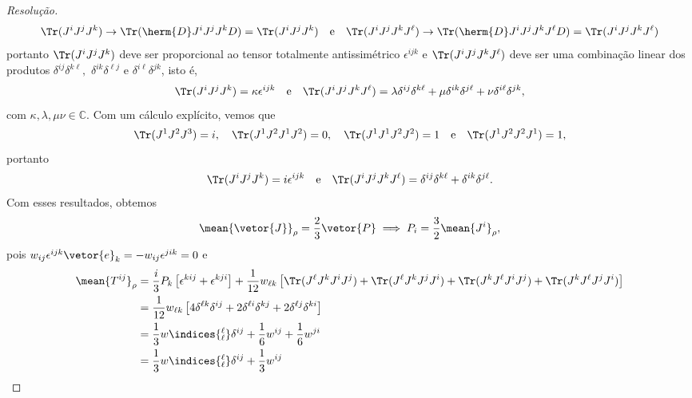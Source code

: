 \begin{proof}[Resolução]
    \begin{equation*}
        \Tr(J^i J^j J^k) \to \Tr(\herm{D} J^i J^j J^k D) = \Tr(J^i J^j J^k)\quad\text{e}\quad
        \Tr(J^i J^j J^k J^\ell) \to \Tr(\herm{D} J^i J^j J^k J^\ell D) = \Tr(J^i J^j J^k J^\ell)
    \end{equation*}
    portanto \(\Tr(J^i J^j J^k)\) deve ser proporcional ao tensor totalmente antissimétrico \(\epsilon^{ijk}\) e \(\Tr(J^i J^j J^k J^\ell)\) deve ser uma combinação linear dos produtos \(\delta^{ij} \delta^{k \ell},\) \(\delta^{i k} \delta^{\ell j}\) e \(\delta^{i \ell} \delta^{jk}\), isto é,
    \begin{equation*}
        \Tr(J^i J^j J^k) = \kappa \epsilon^{ijk}
        \quad\text{e}\quad
        \Tr(J^i J^j J^k J^\ell) = \lambda \delta^{ij} \delta^{k\ell} + \mu \delta^{i k} \delta^{j \ell} + \nu \delta^{i \ell} \delta^{jk},
    \end{equation*}
    com \(\kappa, \lambda, \mu \nu \in \mathbb{C}\). Com um cálculo explícito, vemos que 
    \begin{equation*}
        \Tr(J^1 J^2 J^3) = i,\quad\Tr(J^1 J^2 J^1 J^2) = 0,\quad \Tr(J^1 J^1 J^2 J^2) = 1\quad\text{e}\quad\Tr(J^1 J^2 J^2 J^1) = 1, 
    \end{equation*}
    portanto 
    \begin{equation*}
        \Tr(J^i J^j J^k) = i \epsilon^{ijk}
        \quad\text{e}\quad
        \Tr(J^i J^j J^k J^\ell) = \delta^{ij} \delta^{k \ell} + \delta^{ik} \delta^{j \ell}.
    \end{equation*}
    Com esses resultados, obtemos
    \begin{equation*}
        \mean{\vetor{J}}_{\rho} = \frac23 \vetor{P} \implies P_i = \frac32 \mean{J^i}_\rho,
    \end{equation*}
    pois \(w_{ij} \epsilon^{ijk} \vetor{e}_k = - w_{ij} \epsilon^{jik} = 0\) e
    \begin{align*}
        \mean{T^{ij}}_{\rho} &= \frac{i}{3} P_k \left[\epsilon^{kij} + \epsilon^{kji}\right] + \frac1{12} w_{\ell k} \left[\Tr(J^\ell J^k J^i J^j) + \Tr(J^\ell J^k J^j J^i) + \Tr(J^k J^\ell J^i J^j) + \Tr(J^k J^\ell J^j J^i)\right]\\
                             &= \frac{1}{12} w_{\ell k} \left[4\delta^{\ell k} \delta^{ij} + 2\delta^{\ell i} \delta^{kj} + 2\delta^{\ell j} \delta^{ki}\right]\\
                             &= \frac13 w\indices{^\ell_\ell}\delta^{ij} + \frac16 w^{ij} + \frac16 w^{ji}\\
                             &= \frac13 w\indices{^\ell_\ell}\delta^{ij} + \frac13 w^{ij}
    \end{align*}
\end{proof}
